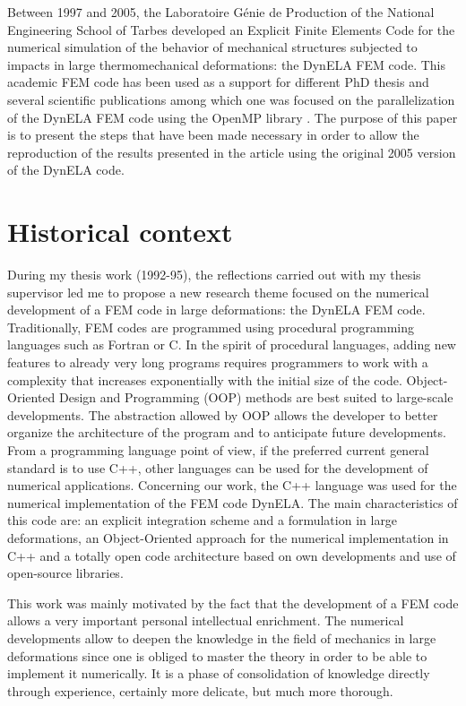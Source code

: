 \documentclass{article}
\begin{document}
Between 1997 and 2005, the Laboratoire G\'enie de Production of the National Engineering School of Tarbes developed an Explicit Finite Elements Code for the numerical simulation of the behavior of mechanical structures subjected to impacts in large thermomechanical deformations: the DynELA FEM code. This academic FEM code has been used as a support for different PhD thesis and several scientific publications \cite{Pantale:2002,Pantale:2004,Menanteau:2006,Nistor:2007,Nistor:2008} among which one was focused on the parallelization of the DynELA FEM code using the OpenMP library \cite{Pantale:2005}. The purpose of this paper is to present the steps that have been made necessary in order to allow the reproduction of the results presented in the article \cite{Pantale:2005} using the original 2005 version of the DynELA code.

\section{Historical context}

During my thesis work (1992-95), the reflections carried out with my thesis supervisor led me to propose a new research theme focused on the numerical development of a FEM code in large deformations: the DynELA FEM code. Traditionally, FEM codes are programmed using procedural programming languages such as Fortran or C. In the spirit of procedural languages, adding new features to already very long programs requires programmers to work with a complexity that increases exponentially with the initial size of the code. Object-Oriented Design and Programming (OOP) methods are best suited to large-scale developments. The abstraction allowed by OOP allows the developer to better organize the architecture of the program and to anticipate future developments. From a programming language point of view, if the preferred current general standard is to use C++, other languages can be used for the development of numerical applications. Concerning our work, the C++ language was used for the numerical implementation of the FEM code DynELA. The main characteristics of this code are: an explicit integration scheme and a formulation in large deformations, an Object-Oriented approach for the numerical implementation in C++ and a totally open code architecture based on own developments and use of open-source libraries.

This work was mainly motivated by the fact that the development of a FEM code allows a very important personal intellectual enrichment. The numerical developments allow to deepen the knowledge in the field of mechanics in large deformations since one is obliged to master the theory in order to be able to implement it numerically. It is a phase of consolidation of knowledge directly through experience, certainly more delicate, but much more thorough.
\end{document}
